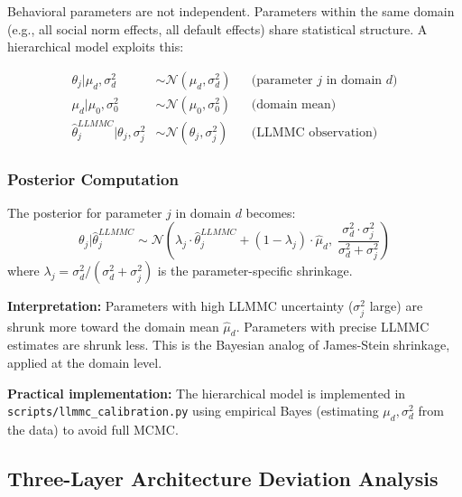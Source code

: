 Behavioral parameters are not independent. Parameters within the same domain
(e.g., all social norm effects, all default effects) share statistical structure.
A hierarchical model exploits this:

\begin{align}
    \theta_j | \mu_d, \sigma^2_d &\sim \mathcal{N}(\mu_d, \sigma^2_d)
    &&\text{(parameter $j$ in domain $d$)} \label{eq:hier-param} \\
    \mu_d | \mu_0, \sigma^2_0 &\sim \mathcal{N}(\mu_0, \sigma^2_0)
    &&\text{(domain mean)} \label{eq:hier-domain} \\
    \hat{\theta}_j^{LLMMC} | \theta_j, \sigma^2_j &\sim \mathcal{N}(\theta_j, \sigma^2_j)
    &&\text{(LLMMC observation)} \label{eq:hier-obs}
\end{align}

\subsubsection{Posterior Computation}
\label{sec:AN-posterior}

The posterior for parameter $j$ in domain $d$ becomes:
\begin{equation}
    \theta_j | \hat{\theta}_j^{LLMMC} \sim \mathcal{N}\!\left(
        \lambda_j \cdot \hat{\theta}_j^{LLMMC} + (1 - \lambda_j) \cdot \hat{\mu}_d, \;
        \frac{\sigma^2_d \cdot \sigma^2_j}{\sigma^2_d + \sigma^2_j}
    \right)
    \label{eq:hier-posterior}
\end{equation}
where $\lambda_j = \sigma^2_d / (\sigma^2_d + \sigma^2_j)$ is the
parameter-specific shrinkage.

\textbf{Interpretation:} Parameters with high LLMMC uncertainty ($\sigma^2_j$ large)
are shrunk more toward the domain mean $\hat{\mu}_d$. Parameters with precise LLMMC
estimates are shrunk less. This is the Bayesian analog of James-Stein shrinkage,
applied at the domain level.

\textbf{Practical implementation:} The hierarchical model is implemented in
\texttt{scripts/llmmc\_calibration.py} using empirical Bayes (estimating
$\mu_d, \sigma^2_d$ from the data) to avoid full MCMC.


\subsection{Three-Layer Architecture Deviation Analysis}
\label{sec:AN-tla-deviation}

